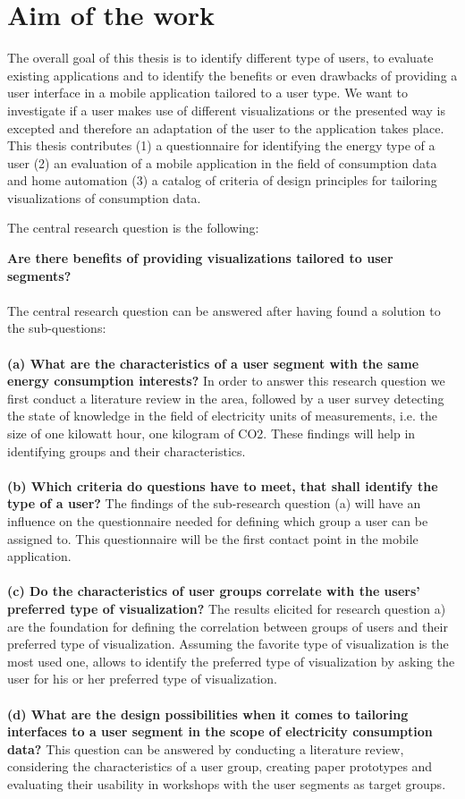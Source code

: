 \section{Aim of the work} 
The overall goal of this thesis is to identify different type of users, to evaluate existing applications and to identify the benefits or even drawbacks of providing a user interface in a mobile application tailored to a user type. We want to investigate if a user makes use of different visualizations or the presented way is excepted and therefore an adaptation of the user to the application takes place.\\
This thesis contributes 
(1) a questionnaire for identifying the energy type of a user 
(2) an evaluation of a mobile application in the field of consumption data and home automation
(3) a catalog of criteria of design principles for tailoring visualizations of consumption data.

The central research question is the following:

\textbf{Are there benefits of providing visualizations tailored to user segments?}
\\\\
The central research question can be answered after having found a solution to the sub-questions:\\\\
\textbf{(a) What are the characteristics of a user segment with the same energy consumption interests?}
In order to answer this research question we first conduct a literature review in the area, followed by a user survey detecting the state of knowledge in the field of electricity units of measurements, i.e. the size of one kilowatt hour, one kilogram of CO2. These findings will help in identifying groups and their characteristics.\\\\
\textbf{(b) Which criteria do questions have to meet, that shall identify the type of a user?}
The findings of the sub-research question (a) will have an influence on the questionnaire needed for defining which group a user can be assigned to. This questionnaire will be the first contact point in the mobile application.
\\\\
\textbf{(c) Do the characteristics of user groups correlate with the users' preferred type of visualization?}
The results elicited for research question a) are the foundation for defining the correlation between groups of users and their preferred type of visualization. Assuming the favorite type of visualization is the most used one, allows to identify the preferred type of visualization by asking the user for his or her preferred type of visualization.
\\\\
\textbf{(d) What are the design possibilities when it comes to tailoring interfaces to a user segment in the scope of electricity consumption data?}
This question can be answered by conducting a literature review, considering the characteristics of a user group, creating paper prototypes and evaluating their usability in workshops with the user segments as target groups.


